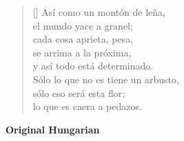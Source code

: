 \documentclass[a4paper,12pt,twoside,final]{book}
\begin{document}
\settowidth{\versewidth}{Sólo lo que no es tiene un arbusto,}

\begin{verse}[\versewidth]
  Así como un montón de leña, \\
  el mundo yace a granel; \\
  cada cosa aprieta, pesa, \\
  se arrima a la próxima, \\
  y así todo está determinado. \\
  Sólo lo que no es tiene un arbusto, \\
  sólo eso será esta flor; \\
  lo que es caera a pedazos. \\
\end{verse}

\newpage


\noindent \textbf{Original Hungarian}



\settowidth{\versewidth}{Csak ami nincs, annak van bokra,}
\end{document}
